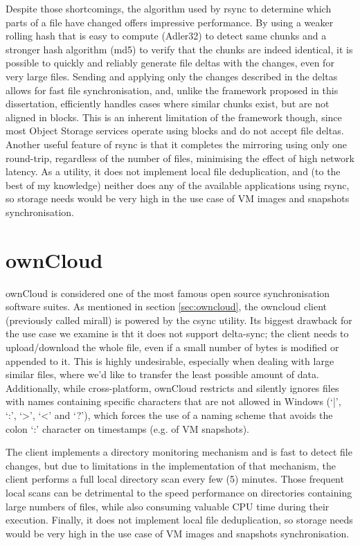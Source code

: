   Despite those shortcomings, the algorithm used by rsync to determine which parts of a file have changed offers impressive performance. By using a weaker rolling hash that is easy to compute (Adler32) to detect same chunks and a stronger hash algorithm (md5) to verify that the chunks are indeed identical, it is possible to quickly and reliably generate file deltas with the changes, even for very large files. Sending and applying only the changes described in the deltas allows for fast file synchronisation, and, unlike the framework proposed in this dissertation, efficiently handles cases where similar chunks exist, but are not aligned in blocks. This is an inherent limitation of the framework though, since most Object Storage services operate using blocks and do not accept file deltas. Another useful feature of rsync is that it completes the mirroring using only one round-trip, regardless of the number of files, minimising the effect of high network latency. As a utility, it does not implement local file deduplication, and (to the best of my knowledge) neither does any of the available applications using rsync, so storage needs would be very high in the use case of VM images and snapshots synchronisation.

\section{ownCloud}
  ownCloud is considered one of the most famous open source synchronisation software suites. As mentioned in section \ref{sec:owncloud}, the owncloud client (previously called mirall) is powered by the csync utility. Its biggest drawback for the use case we examine is tht it does not support delta-sync; the client needs to upload/download the whole file, even if a small number of bytes is modified or appended to it. This is highly undesirable, especially when dealing with large similar files, where we'd like to transfer the least possible amount of data. Additionally, while cross-platform, ownCloud restricts and silently ignores files with names containing specific characters that are not allowed in Windows (`|', `:', `>', `<' and `?'), which forces the use of a naming scheme that avoids the colon `:' character on timestamps (e.g. of VM snapshots).

  The client implements a directory monitoring mechanism and is fast to detect file changes, but due to limitations in the implementation of that mechanism, the client performs a full local directory scan every few (5) minutes. Those frequent local scans can be detrimental to the speed performance on directories containing large numbers of files, while also consuming valuable CPU time during their execution. Finally, it does not implement local file deduplication, so storage needs would be very high in the use case of VM images and snapshots synchronisation.

